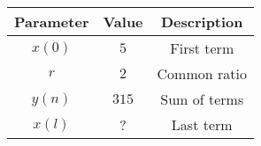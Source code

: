\begin{tabular}{|c|c|c|}
    \hline
    \textbf{Parameter} & \textbf{Value} & \textbf{Description} \\
    \hline
    $x(0)$ & $5$ & First term \\
    \hline
    $r$ & $2$ & Common ratio \\
    \hline
    $y(n)$ & $315$ & Sum of terms \\
    \hline
    $x(l)$ & ? & Last term\\
    \hline
\end{tabular}

